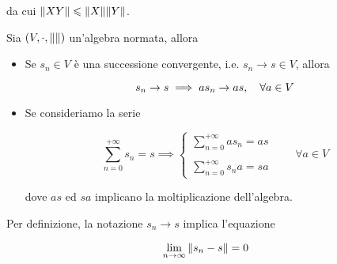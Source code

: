 da cui $ \norm{X Y} \leqslant \norm{X} \norm{Y} $.

\begin{definition}
	Sia $ (V,\cdot,\norm{}) $ un'algebra normata, allora
	
	\begin{itemize}
		\item Se $ s_{n} \in V $ è una successione convergente, i.e. $ s_{n} \to s \in V $, allora
		
		\begin{equation}
			s_{n} \to s \implies a s_{n} \to a s \qcomma \forall a \in V
		\end{equation}
	
		\item Se consideriamo la serie
		
		\begin{equation}
			\sum_{n=0}^{+\infty} s_{n} = s %
			\implies %
			\begin{cases}
				\displaystyle \sum_{n=0}^{+\infty} a s_{n} = a s \\\\
				\displaystyle \sum_{n=0}^{+\infty} s_{n} a = s a
			\end{cases}
			\qquad \forall a \in V
		\end{equation}
	
		dove $ a s $ ed $ s a $ implicano la moltiplicazione dell'algebra.
	\end{itemize}
\end{definition}

Per definizione, la notazione $ s_{n} \to s $ implica l'equazione

\begin{equation}
	\lim_{n \to \infty} \norm{s_{n} - s} = 0
\end{equation}

